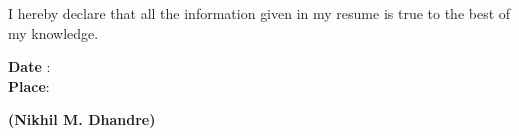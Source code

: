 \documentclass[a4paper,11pt]{memoir} %
\begin{document}

\vspace{1cm}
I hereby declare that all the information given in my resume is true to the best of my knowledge.
\vspace{1cm}
\begin{flushleft}
\textbf{\small Date} \hspace{0.20cm}:\, \\
\textbf{\small Place}\hspace{0.21cm}:\,    
\end{flushleft}

\begin{flushright}
\textbf{(\small Nikhil M. Dhandre)} 
\end{flushright}
\end{document}
